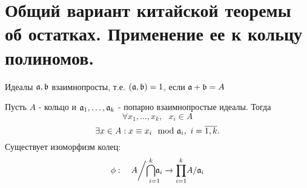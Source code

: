 \section{Общий вариант китайской теоремы об остатках. Применение ее к кольцу полиномов.}

\begin{defn}
Идеалы $\mathfrak{a}, \mathfrak{b}$ взаимнопросты, т.е. $(\mathfrak{a}, \mathfrak{b}) = 1$, если $\mathfrak{a} + \mathfrak{b} = A$
\end{defn}

\begin{thm}
Пусть $A$ - кольцо и $\mathfrak{a}_1, \dots, \mathfrak{a}_k$ - попарно взаимнопростые идеалы. Тогда
\[\forall x_1, \dots, x_k, ~~~x_i \in A\]
\[\exists x \in A: x \equiv x_i \mod \Id{a}_i, ~i = \overline{1, k}.\]
Существует изоморфизм колец:
\[\phi:~~~A\bigg/\underset{i = 1}{\overset{k}\bigcap \mathfrak{a}_i} \rightarrow \underset{i = 1}{\overset{k}\prod} A/\mathfrak{a}_i\]
\end{thm}
